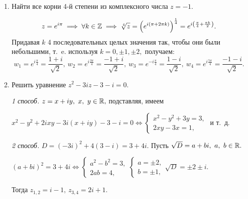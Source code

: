 \documentclass[../../main.tex]{subfiles}
\begin{document}
\begin{examples}
\begin{enumerate}
			
		\item Найти все корни 4-й степени из комплексного числа $z = -1.$
		
		\[z = e^{i\pi} \implies \forall k\in\mathbb{Z} \implies \sqrt[4]{z} =
		\left(e^{i(\pi+2\pi k)}\right)^{\frac{1}{4}} = e^{i\left(
			\frac{\pi}{4}+\frac{\pi k}{2}\right)}.  \]
		Придавая $k$ 4 последовательных целых значения так, чтобы они были 
		небольшими, т.~e. используя $k = 0, \pm 1, \pm 2,$ получаем:
		\[w_1 = e^{i\frac{\pi}{4}} = \frac{1+i}{\sqrt{2}},\ w_2 = 
		e^{i\frac{3\pi}{4}} = \frac{-1+i}{\sqrt{2}},\
		w_3 = e^{-i\frac{\pi}{4}} = \frac{1-i}{\sqrt{2}},\ w_4 = 
		e^{i\frac{5\pi}{4}} = \frac{-1-i}{\sqrt{2}}.\]
		
		\item Решить уравнение $z^2 - 3iz - 3- i = 0.$
		
		\emph{1 способ.} $z = x+iy,\ x,\ y\in\R,$ подставляя, имеем
		
		$x^2 - y^2 +2ixy - 3i(x+iy) - 3- i =0 \iff
		\begin{cases} 
		x^2 - y^2 + 3y  = 3,\\
		2xy - 3x  =1,
		\end{cases}$ и т.~д.
		
		\emph{2 способ.}
		$D = (-3i)^2 + 4(3-i) =3+4i.$ Пусть $\sqrt{D} = a + bi,\ a,\ b \in \mathbb{R}.$
		
		$(a+bi)^2 = 3+4i \iff 
		\begin{cases} 
		a^2 - b^2 = 3,\\
		2ab  = 4,
		\end{cases}
		\begin{cases} 
		a = \pm 2,\\
		b  = \pm 1,
		\end{cases}
		\sqrt{D} = \pm2\pm i.
		$
		
		Тогда $z_{1, 2} = i-1,\ z_{3, 4} =2i+1. $
		\end{enumerate}
		\end{examples}
\end{document}
